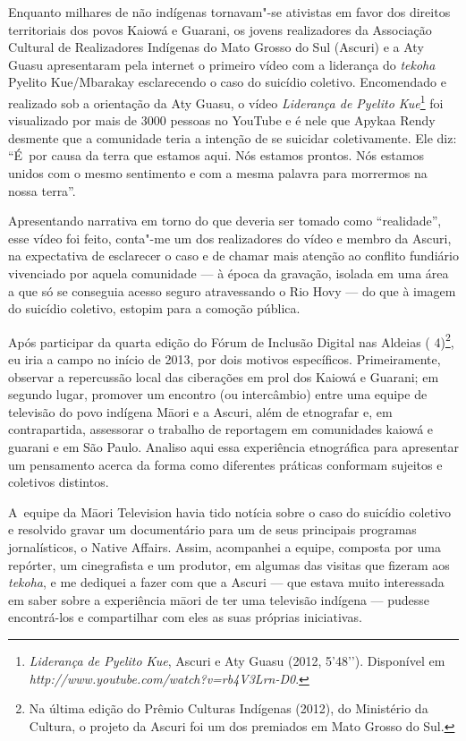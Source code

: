 Enquanto milhares de não indígenas tornavam"-se ativistas em favor dos
direitos territoriais dos povos Kaiowá e Guarani, os jovens
realizadores da Associação Cultural de Realizadores Indígenas do Mato
Grosso do Sul (Ascuri) e a Aty Guasu apresentaram pela internet o
primeiro vídeo com a liderança do \emph{tekoha} Pyelito Kue/Mbarakay
esclarecendo o caso do suicídio coletivo. Encomendado e realizado sob a
orientação da Aty Guasu, o vídeo \emph{Liderança de Pyelito
Kue}\footnote[5]{\emph{Liderança de Pyelito Kue}, Ascuri e Aty Guasu (2012,
5’48’’). Disponível em \emph{http://www.youtube.com/watch?v=rb4V3Lrn-D0}.} foi
visualizado por mais de 3000 pessoas no YouTube e é nele que Apykaa
Rendy desmente que a comunidade teria a intenção de se suicidar
coletivamente. Ele diz: ``É~por causa da terra que estamos aqui. Nós
estamos prontos. Nós estamos unidos com o mesmo sentimento e com a
mesma palavra para morrermos na nossa terra''.

Apresentando narrativa em torno do que deveria ser tomado como
``realidade'', esse vídeo foi feito, conta"-me um dos realizadores do
vídeo e membro da Ascuri, na expectativa de esclarecer o caso e de
chamar mais atenção ao conflito fundiário vivenciado por aquela
comunidade --- à época da gravação, isolada em uma área a que só se
conseguia acesso seguro atravessando o Rio Hovy --- do que à imagem do
suicídio coletivo, estopim para a comoção pública.

Após participar da quarta edição do Fórum de Inclusão Digital nas
Aldeias ( 4)\footnote[6]{Na última edição do Prêmio Culturas Indígenas
(2012), do Ministério da Cultura, o projeto da Ascuri foi um dos
premiados em Mato Grosso do Sul.}, eu iria a campo no início de 2013,
por dois motivos específicos. Primeiramente, observar a repercussão
local das ciberações em prol dos Kaiowá e Guarani; em segundo lugar,
promover um encontro (ou intercâmbio) entre uma equipe de televisão do
povo indígena M\=aori e a Ascuri, além de etnografar e, em
contrapartida, assessorar o trabalho de reportagem em comunidades
kaiowá e guarani e em São Paulo. Analiso aqui essa experiência
etnográfica para apresentar um pensamento acerca da forma como
diferentes práticas conformam sujeitos e coletivos distintos.

A~equipe da M\=aori Television havia tido notícia sobre o caso do
suicídio coletivo e resolvido gravar um documentário para um de seus
principais programas jornalísticos, o Native Affairs. Assim, acompanhei
a equipe, composta por uma repórter, um cinegrafista e um produtor, em
algumas das visitas que fizeram aos \emph{tekoha}, e me dediquei a fazer com
que a Ascuri --- que estava muito interessada em saber sobre a
experiência m\=aori de ter uma televisão indígena --- pudesse
encontrá-los e compartilhar com eles as suas próprias iniciativas.

